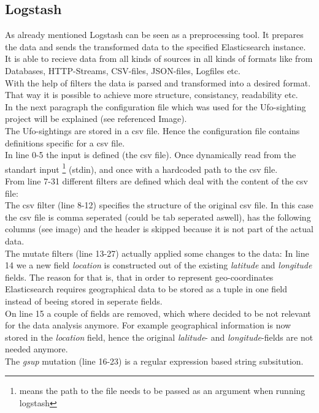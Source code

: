 \documentclass[bibliography=totoc]{article}
\begin{document}
\subsection{Logstash}
As already mentioned Logstash can be seen as a preprocessing tool.
It prepares the data and sends the transformed data to the specified 
Elasticsearch instance.
It is able to recieve data from all kinds of sources in all kinds of formats like from Databases, HTTP-Streams, 
CSV-files, JSON-files, Logfiles etc.
\\
With the help of filters the data is parsed and transformed into a
desired format. That way it is possible to achieve more structure, consistancy,
readability etc.
\\
In the next paragraph the configuration file which was used for the
Ufo-sighting project will be explained (see referenced Image).
\\
The Ufo-sightings are stored in a csv file. Hence the configuration file 
contains definitions specific for a csv file.
\\
In line 0-5 the input is defined (the csv file). Once dynamically read 
from the standart input \footnote{means the path to the file needs to be passed as an argument when running logstash} (stdin),
and once with a hardcoded path to the csv file.
\\
From line 7-31 different filters are defined which deal with the content 
of the csv file:
\\
The csv filter (line 8-12) specifies the structure of the original csv file.
In this case the csv file is comma seperated (could be tab seperated aswell),
has the following columns (see image) and the header is skipped because
it is not part of the actual data.
\\
The mutate filters (line 13-27) actually applied some changes to the data:
In line 14 we a new field \textit{location} is constructed out of the 
existing \textit{latitude} and \textit{longitude} fields. The reason for 
that is, that in order to represent geo-coordinates Elasticsearch requires geographical data to be stored as a tuple
in one field instead of beeing stored in seperate fields.
\\
On line 15 a couple of fields are removed, which where decided to be not relevant
for the data analysis anymore. For example geographical information is now 
stored in the \textit{location} field, hence the original \textit{lalitude}- and \textit{longitude}-fields
are not needed anymore.
\\
The \textit{gsup} mutation (line 16-23) is a regular expression based string subsitution.
\end{document}
